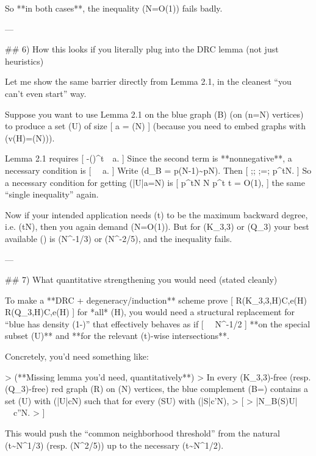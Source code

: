 So **in both cases**, the inequality (\varepsilon\sqrt N=O(1)) fails badly.

---

## 6) How this looks if you literally plug into the DRC lemma (not just heuristics)

Let me show the same barrier directly from Lemma 2.1, in the cleanest “you can’t even start” way.

Suppose you want to use Lemma 2.1 on the blue graph (B) (on (n=N) vertices) to produce a set (U) of size
[
a = \Theta(N)
]
(because you need to embed graphs with (v(H)=\Theta(N))).

Lemma 2.1 requires
[
-\left(\right)^{t}\ \ge\ a.
]
Since the second term is **nonnegative**, a necessary condition is
[
 \ \ge\ a.
]
Write (d_B = p(N-1)\sim pN). Then
[
;\le;
;=;
p^{t}N.
]
So a necessary condition for getting (|U|\ge a=\alpha N) is
[
p^{t}N \ge \alpha N
\quad\Longrightarrow\quad
p^{t}\ge \alpha
\quad\Longrightarrow\quad
\varepsilon t = O(1),
]
the same “single inequality” again.

Now if your intended application needs (t) to be the maximum backward degree, i.e. (t\asymp \sqrt N), then you again demand (\varepsilon\sqrt N=O(1)). But for (K_{3,3}) or (Q_3) your best available (\varepsilon) is (N^{-1/3}) or (N^{-2/5}), and the inequality fails.

---

## 7) What quantitative strengthening you would need (stated cleanly)

To make a **DRC + degeneracy/induction** scheme prove
[
R(K_{3,3},H)\le C,e(H)
\quad{}\quad
R(Q_3,H)\le C,e(H)
]
for *all* (H), you would need a structural replacement for “blue has density (1-\varepsilon)” that effectively behaves as if
[
\varepsilon \ \lesssim\ N^{-1/2}
]
**on the special subset (U)** and **for the relevant (t)-wise intersections**.

Concretely, you’d need something like:

> (**Missing lemma you’d need, quantitatively**)
> In every (K_{3,3})-free (resp. (Q_3)-free) red graph (R) on (N) vertices, the blue complement (B=) contains a set (U) with (|U|\ge cN) such that for every (S\subseteq U) with (|S|\le c'\sqrt N),
> [
> |N_B(S)\cap U|\ \ge\ c''N.
> ]

This would push the “common neighborhood threshold” from the natural (t\sim N^{1/3}) (resp. (N^{2/5})) up to the necessary (t\sim N^{1/2}).

